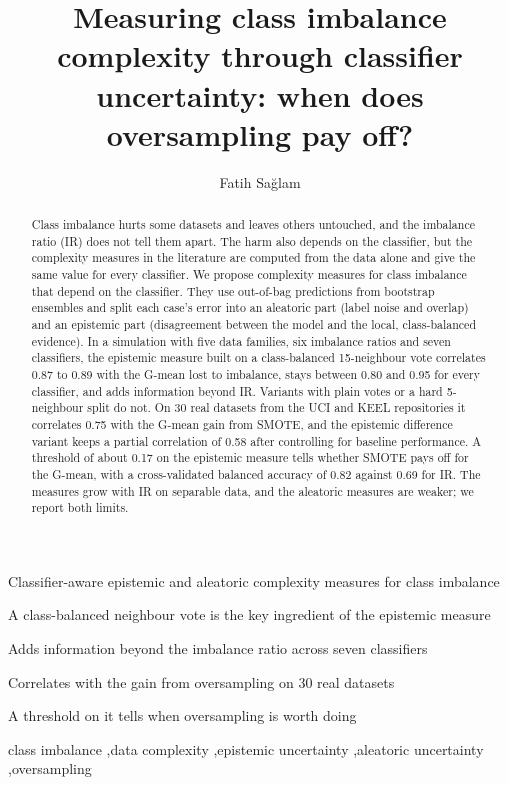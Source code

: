 \documentclass[preprint,12pt]{elsarticle}
\begin{document}
\begin{frontmatter}

\title{Measuring class imbalance complexity through classifier uncertainty: when does oversampling pay off?}

\author[omu]{Fatih Sa\u{g}lam}

\begin{abstract}
Class imbalance hurts some datasets and leaves others untouched, and the imbalance ratio (IR) does not tell them apart. The harm also depends on the classifier, but the complexity measures in the literature are computed from the data alone and give the same value for every classifier. We propose complexity measures for class imbalance that depend on the classifier. They use out-of-bag predictions from bootstrap ensembles and split each case's error into an aleatoric part (label noise and overlap) and an epistemic part (disagreement between the model and the local, class-balanced evidence). In a simulation with five data families, six imbalance ratios and seven classifiers, the epistemic measure built on a class-balanced 15-neighbour vote correlates 0.87 to 0.89 with the G-mean lost to imbalance, stays between 0.80 and 0.95 for every classifier, and adds information beyond IR. Variants with plain votes or a hard 5-neighbour split do not. On 30 real datasets from the UCI and KEEL repositories it correlates 0.75 with the G-mean gain from SMOTE, and the epistemic difference variant keeps a partial correlation of 0.58 after controlling for baseline performance. A threshold of about 0.17 on the epistemic measure tells whether SMOTE pays off for the G-mean, with a cross-validated balanced accuracy of 0.82 against 0.69 for IR. The measures grow with IR on separable data, and the aleatoric measures are weaker; we report both limits.
\end{abstract}

\begin{highlights}
\item Classifier-aware epistemic and aleatoric complexity measures for class imbalance
\item A class-balanced neighbour vote is the key ingredient of the epistemic measure
\item Adds information beyond the imbalance ratio across seven classifiers
\item Correlates with the gain from oversampling on 30 real datasets
\item A threshold on it tells when oversampling is worth doing
\end{highlights}

\begin{keyword}
class imbalance \sep data complexity \sep epistemic uncertainty \sep aleatoric uncertainty \sep oversampling
\end{keyword}

\end{frontmatter}
\end{document}
